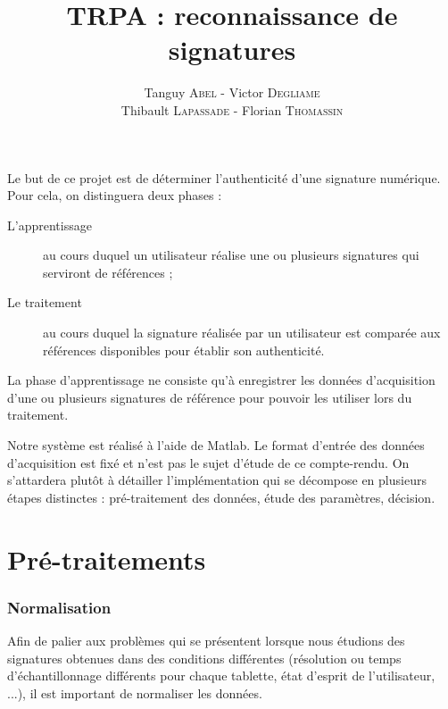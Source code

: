 \documentclass[fontsize=10pt, twoside=no]{scrartcl} %
\begin{document}
\title{TRPA : reconnaissance de signatures}
\author{Tanguy \textsc{Abel} - Victor \textsc{Degliame}\\Thibault \textsc{Lapassade} - Florian \textsc{Thomassin}}
\date{}
\maketitle
\vspace*{-3cm}

\part{}

Le but de ce projet est de déterminer l'authenticité d'une signature numérique. Pour cela, on distinguera deux phases :

\begin{description}
\item[L'apprentissage] au cours duquel un utilisateur réalise une ou plusieurs signatures qui serviront de références ;
\item[Le traitement] au cours duquel la signature réalisée par un utilisateur est comparée aux références disponibles pour établir son authenticité.
\end{description}

La phase d'apprentissage ne consiste qu'à enregistrer les données d'acquisition d'une ou plusieurs signatures de référence pour pouvoir les utiliser lors du traitement.

Notre système est réalisé à l'aide de Matlab. Le format d'entrée des données d'acquisition est fixé et n'est pas le sujet d'étude de ce compte-rendu. On s'attardera plutôt à détailler l'implémentation qui se décompose en plusieurs étapes distinctes : pré-traitement des données, étude des paramètres, décision.

\part{Pré-traitements}

\section{Normalisation}

Afin de palier aux problèmes qui se présentent lorsque nous étudions des signatures obtenues dans des conditions différentes (résolution ou temps d'échantillonnage différents pour chaque tablette, état d'esprit de l'utilisateur, ...), il est important de normaliser les données.
\end{document}
